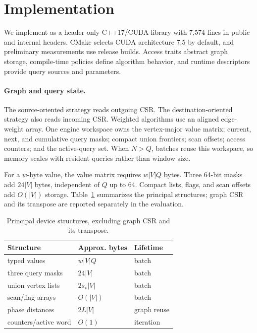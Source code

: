 \section{Implementation}
\label{sec:implementation}

We implement \system as a header-only C++17/CUDA library with 7,574 lines in public and internal headers.  CMake selects CUDA architecture 7.5 by default, and preliminary measurements use release builds.  Access traits abstract graph storage, compile-time policies define algorithm behavior, and runtime descriptors provide query sources and parameters.

\paragraph{Graph and query state.}
The source-oriented strategy reads outgoing CSR.  The destination-oriented strategy also reads incoming CSR.  Weighted algorithms use an aligned edge-weight array.  One engine workspace owns the vertex-major value matrix; current, next, and cumulative query masks; compact union frontiers; scan offsets; access counters; and the active-query set.  When $N>Q$, batches reuse this workspace, so memory scales with resident queries rather than window size.

For a $w$-byte value, the value matrix requires $w|V|Q$ bytes.  Three 64-bit masks add $24|V|$ bytes, independent of $Q$ up to 64.  Compact lists, flags, and scan offsets add $O(|V|)$ storage.  Table~\ref{tab:workspace} summarizes the principal structures; graph CSR and its transpose are reported separately in the evaluation.

\begin{table}[t]
  \centering
  \caption{Principal device structures, excluding graph CSR and its transpose.}
  \label{tab:workspace}
  \small
  \begin{tabular}{lll}
    \toprule
    Structure & Approx. bytes & Lifetime \\
    \midrule
    typed values & $w|V|Q$ & batch \\
    three query masks & $24|V|$ & batch \\
    union vertex lists & $2s_v|V|$ & batch \\
    scan/flag arrays & $O(|V|)$ & batch \\
    phase distances & $2L|V|$ & graph reuse \\
    counters/active word & $O(1)$ & iteration \\
    \bottomrule
  \end{tabular}
\end{table}

